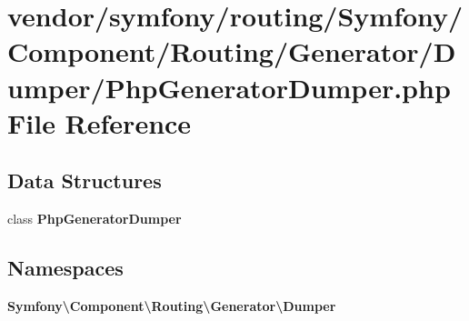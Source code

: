 \section{vendor/symfony/routing/\+Symfony/\+Component/\+Routing/\+Generator/\+Dumper/\+Php\+Generator\+Dumper.php File Reference}
\label{_php_generator_dumper_8php}
\subsection*{Data Structures}
\begin{DoxyCompactItemize}
\item 
class {\bf Php\+Generator\+Dumper}
\end{DoxyCompactItemize}
\subsection*{Namespaces}
\begin{DoxyCompactItemize}
\item 
 {\bf Symfony\textbackslash{}\+Component\textbackslash{}\+Routing\textbackslash{}\+Generator\textbackslash{}\+Dumper}
\end{DoxyCompactItemize}
